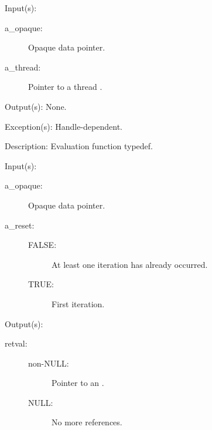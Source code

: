 \begin{capi}
\label{cw_nxo_handle_eval_t}
	\begin{capilist}
	\item[Input(s): ]
		\begin{description}\item[]
		\item[a\_opaque: ]
			Opaque data pointer.
		\item[a\_thread: ]
			Pointer to a thread .
		\end{description}
	\item[Output(s): ] None.
	\item[Exception(s): ] Handle-dependent.
	\item[Description: ]
		Evaluation function typedef.
	\end{capilist}
\label{cw_nxo_handle_ref_iter_t}
	\begin{capilist}
	\item[Input(s): ]
		\begin{description}\item[]
		\item[a\_opaque: ]
			Opaque data pointer.
		\item[a\_reset: ]
			\begin{description}\item[]
			\item[FALSE: ]
				At least one iteration has already occurred.
			\item[TRUE: ]
				First iteration.
			\end{description}
		\end{description}
	\item[Output(s): ]
		\begin{description}\item[]
		\item[retval: ]
			\begin{description}\item[]
			\item[non-NULL: ]
				Pointer to an \classname{nxoe}.
			\item[NULL: ]
				No more references.
			\end{description}
		\end{description}

\end{capilist}
\end{capi}
